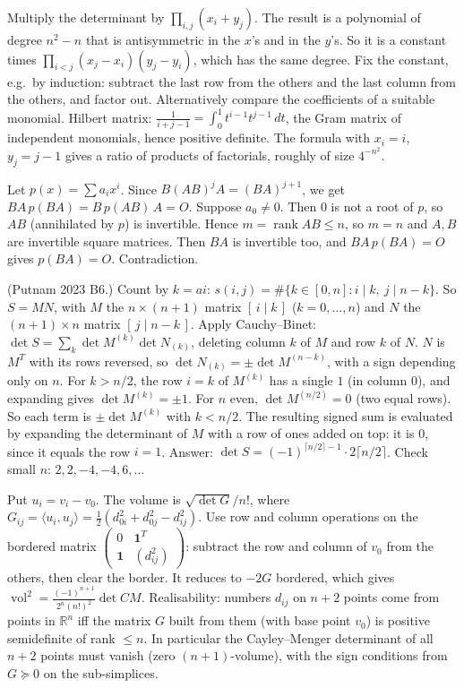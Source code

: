 \documentclass[11pt,a4paper]{article}
\begin{document}
Multiply the determinant by \(\prod_{i,j}(x_i+y_j)\). The result is a polynomial of degree \(n^2-n\) that is antisymmetric in the \(x\)'s and in the \(y\)'s. So it is a constant times \(\prod_{i<j}(x_j-x_i)(y_j-y_i)\), which has the same degree.
Fix the constant, e.g.\ by induction: subtract the last row from the others and the last column from the others, and factor out. Alternatively compare the coefficients of a suitable monomial.
Hilbert matrix: \(\frac1{i+j-1}=\int_0^1t^{i-1}t^{j-1}\,dt\), the Gram matrix of independent monomials, hence positive definite. The formula with \(x_i=i\), \(y_j=j-1\) gives a ratio of products of factorials, roughly of size \(4^{-n^2}\).

Let \(p(x)=\sum a_ix^i\). Since \(B(AB)^jA=(BA)^{j+1}\), we get \(BA\,p(BA)=B\,p(AB)\,A=O\).
Suppose \(a_0\ne0\). Then \(0\) is not a root of \(p\), so \(AB\) (annihilated by \(p\)) is invertible. Hence \(m=\operatorname{rank}AB\le n\), so \(m=n\) and \(A,B\) are invertible square matrices.
Then \(BA\) is invertible too, and \(BA\,p(BA)=O\) gives \(p(BA)=O\). Contradiction.

(Putnam 2023 B6.) Count by \(k=ai\): \(s(i,j)=\#\{k\in[0,n]:i\mid k,\ j\mid n-k\}\). So \(S=MN\), with \(M\) the \(n\times(n+1)\) matrix \([\,i\mid k\,]\) (\(k=0,\dots,n\)) and \(N\) the \((n+1)\times n\) matrix \([\,j\mid n-k\,]\). Apply Cauchy--Binet: \(\det S=\sum_k\det M^{(k)}\det N_{(k)}\), deleting column \(k\) of \(M\) and row \(k\) of \(N\).
\(N\) is \(M^T\) with its rows reversed, so \(\det N_{(k)}=\pm\det M^{(n-k)}\), with a sign depending only on \(n\). For \(k>n/2\), the row \(i=k\) of \(M^{(k)}\) has a single \(1\) (in column \(0\)), and expanding gives \(\det M^{(k)}=\pm1\). For \(n\) even, \(\det M^{(n/2)}=0\) (two equal rows).
So each term is \(\pm\det M^{(k)}\) with \(k<n/2\). The resulting signed sum is evaluated by expanding the determinant of \(M\) with a row of ones added on top: it is \(0\), since it equals the row \(i=1\). Answer: \(\det S=(-1)^{\lceil n/2\rceil-1}\cdot2\lceil n/2\rceil\). Check small \(n\): \(2,2,-4,-4,6,\dots\)

Put \(u_i=v_i-v_0\). The volume is \(\sqrt{\det G}/n!\), where \(G_{ij}=\langle u_i,u_j\rangle=\frac12(d_{0i}^2+d_{0j}^2-d_{ij}^2)\).
Use row and column operations on the bordered matrix \(\begin{pmatrix}0&\mathbf1^T\\\mathbf1&(d_{ij}^2)\end{pmatrix}\): subtract the row and column of \(v_0\) from the others, then clear the border. It reduces to \(-2G\) bordered, which gives \(\operatorname{vol}^2=\frac{(-1)^{n+1}}{2^n(n!)^2}\det CM\).
Realisability: numbers \(d_{ij}\) on \(n+2\) points come from points in \(\mathbb R^n\) iff the matrix \(G\) built from them (with base point \(v_0\)) is positive semidefinite of rank \(\le n\). In particular the Cayley--Menger determinant of all \(n+2\) points must vanish (zero \((n+1)\)-volume), with the sign conditions from \(G\succeq0\) on the sub-simplices.
\end{document}
